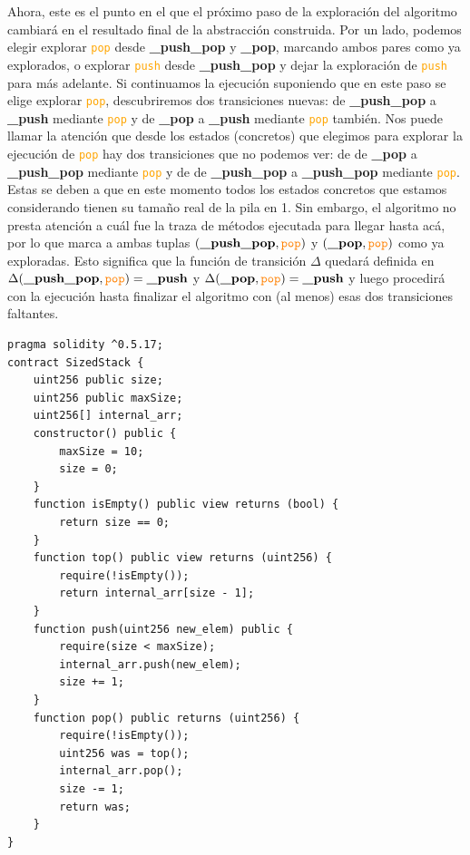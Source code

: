 Ahora, este es el punto en el que el próximo paso de la exploración del algoritmo cambiará en el resultado final de la abstracción construida.
Por un lado, podemos elegir explorar \textcolor{orange}{\texttt{pop}} desde \textbf{\_push\_pop} y \textbf{\_pop}, marcando ambos pares como ya explorados, o explorar \textcolor{orange}{\texttt{push}} desde \textbf{\_push\_pop} y dejar la exploración de \textcolor{orange}{\texttt{push}} para más adelante.
Si continuamos la ejecución suponiendo que en este paso se elige explorar \textcolor{orange}{\texttt{pop}}, descubriremos dos transiciones nuevas: de \textbf{\_push\_pop} a \textbf{\_push} mediante \textcolor{orange}{\texttt{pop}} y de \textbf{\_pop} a \textbf{\_push} mediante \textcolor{orange}{\texttt{pop}} también.
Nos puede llamar la atención que desde los estados (concretos) que elegimos para explorar la ejecución de \textcolor{orange}{\texttt{pop}} hay dos transiciones que no podemos ver: de de \textbf{\_pop} a \textbf{\_push\_pop} mediante \textcolor{orange}{\texttt{pop}} y de de \textbf{\_push\_pop} a \textbf{\_push\_pop} mediante \textcolor{orange}{\texttt{pop}}.
Estas se deben a que en este momento todos los estados concretos que estamos considerando tienen su tamaño real de la pila en 1.
Sin embargo, el algoritmo no presta atención a cuál fue la traza de métodos ejecutada para llegar hasta acá, por lo que marca a ambas tuplas $(\textbf{\_push\_pop},\textcolor{orange}{\texttt{pop}})$ y $(\textbf{\_pop},\textcolor{orange}{\texttt{pop}})$ como ya exploradas.
Esto significa que la función de transición $\Delta$ quedará definida en $\Delta(\textbf{\_push\_pop},\textcolor{orange}{\texttt{pop}}) = \textbf{\_push}$ y $\Delta(\textbf{\_pop},\textcolor{orange}{\texttt{pop}}) = \textbf{\_push}$ y luego procedirá con la ejecución hasta finalizar el algoritmo con (al menos) esas dos transiciones faltantes.

\begin{lstlisting}[language=Solidity, label={fig:bounded-stack}, caption={Contrato Inteligente \texttt{BoundedStack} en Solidity},captionpos=b]
pragma solidity ^0.5.17;
contract SizedStack {
    uint256 public size;
    uint256 public maxSize;
    uint256[] internal_arr;
    constructor() public {
        maxSize = 10;
        size = 0;
    }
    function isEmpty() public view returns (bool) {
        return size == 0;
    }
    function top() public view returns (uint256) {
        require(!isEmpty());
        return internal_arr[size - 1];
    }
    function push(uint256 new_elem) public {
        require(size < maxSize);
        internal_arr.push(new_elem);
        size += 1;
    }
    function pop() public returns (uint256) {
        require(!isEmpty());
        uint256 was = top();
        internal_arr.pop();
        size -= 1;
        return was;
    }
}
\end{lstlisting}

